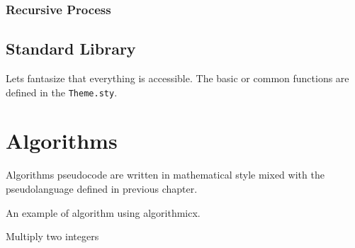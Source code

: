 \documentclass{book}
\begin{document}
\subsection{Recursive Process}

\section{Standard Library}
Lets fantasize that everything is accessible.
The basic or common functions are defined in the \verb|Theme.sty|.

\chapter{Algorithms}
Algorithms pseudocode are written in mathematical style mixed
with the pseudolanguage defined in previous chapter.

\begin{example}
    An example of algorithm using algorithmicx.
    \begin{algorithm}
        \caption{Multiply two integers}
        \begin{algorithmic}
            \Statex
                \EndWhile
            \EndFunction
        \end{algorithmic}
    \end{algorithm}
\end{example}
\end{document}
